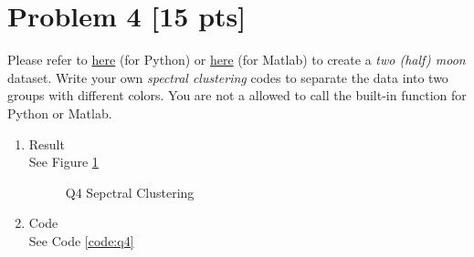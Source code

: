 \documentclass[11pt]{article}
\newcommand{\mfile}[1]  {{\small }} %
\begin{document}
\section{Problem 4 [15 pts]}
Please refer to \href{https://shadow-ssml.readthedocs.io/en/latest/examples/halfmoons_example.html}{here} (for Python) or \href{https://github.com/jaejun-yoo/shallow-DANN-two-moon-dataset}{here} (for Matlab) to create a \textit{two (half) moon} dataset. Write your own \textit{spectral clustering} codes to separate the data into two groups with different colors.  You are not a allowed to call the built-in function for Python or Matlab.
\begin{enumerate}
	\item Result\\
		See Figure \ref{fig:Q4}
		\begin{figure}[h!]
			\centering
			\caption{Q4 Sepctral Clustering}
			\label{fig:Q4}
		  \end{figure} 
	\item Code\\
	See Code \ref{code:q4}
	
\end{enumerate}
\newpage
\end{document}
